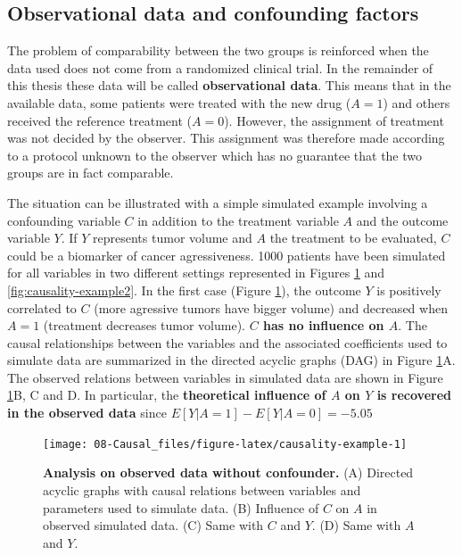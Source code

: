 \documentclass[a4paper,12pt,twoside,onecolumn,openright,final,oldfontcommands]{memoir}
\begin{document}
\subsection{Observational data and confounding
factors}\label{observational-data-and-confounding-factors}

The problem of comparability between the two groups is reinforced when
the data used does not come from a randomized clinical trial. In the
remainder of this thesis these data will be called \textbf{observational
data}. This means that in the available data, some patients were treated
with the new drug (\(A=1\)) and others received the reference treatment
(\(A=0\)). However, the assignment of treatment was not decided by the
observer. This assignment was therefore made according to a protocol
unknown to the observer which has no guarantee that the two groups are
in fact comparable.

The situation can be illustrated with a simple simulated example
involving a confounding variable \(C\) in addition to the treatment
variable \(A\) and the outcome variable \(Y\). If \(Y\) represents tumor
volume and \(A\) the treatment to be evaluated, \(C\) could be a
biomarker of cancer agressiveness. 1000 patients have been simulated for
all variables in two different settings represented in Figures
\ref{fig:causality-example} and \ref{fig:causality-example2}. In the
first case (Figure \ref{fig:causality-example}), the outcome \(Y\) is
positively correlated to \(C\) (more agressive tumors have bigger
volume) and decreased when \(A=1\) (treatment decreases tumor volume).
\textbf{\(C\) has no influence on \(A\)}. The causal relationships
between the variables and the associated coefficients used to simulate
data are summarized in the directed acyclic graphs (DAG) in Figure
\ref{fig:causality-example}A. The observed relations between variables
in simulated data are shown in Figure \ref{fig:causality-example}B, C
and D. In particular, the \textbf{theoretical influence of \(A\) on
\(Y\) is recovered in the observed data} since
\(E[Y|A=1]-E[Y|A=0]=-5.05\)

\begin{figure}

{\centering \texttt{[image: 08-Causal\_files/figure-latex/causality-example-1]} 

}

\caption[Analysis on observed data without confounder]{\textbf{Analysis on observed data
without confounder.} (A) Directed acyclic graphs with causal relations
between variables and parameters used to simulate data. (B) Influence of
\(C\) on \(A\) in observed simulated data. (C) Same with \(C\) and
\(Y\). (D) Same with \(A\) and \(Y\).}\label{fig:causality-example}
\end{figure}
\end{document}
